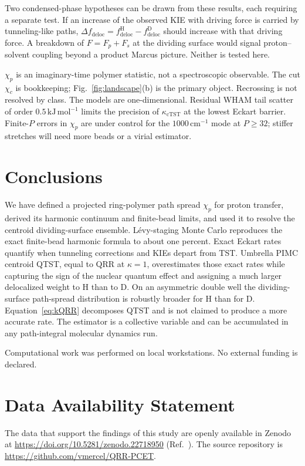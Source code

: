 \documentclass[%
 aip,
 jcp,
 amsmath,amssymb,
 reprint,
 floatfix,
]{revtex4-2}
\newcommand{\chip}{\chi_p}
\begin{document}
Two condensed-phase hypotheses can be drawn from these results, each requiring a separate test. If an increase of the observed KIE with driving force\cite{goldsmith2019,koper2011} is carried by tunneling-like paths, $\Delta f_{\mathrm{deloc}}=f_{\mathrm{deloc}}^{\mathrm{H}}-f_{\mathrm{deloc}}^{\mathrm{D}}$ should increase with that driving force. A breakdown of $F=F_p+F_s$ at the dividing surface would signal proton--solvent coupling beyond a product Marcus picture. Neither is tested here.

$\chip$ is an imaginary-time polymer statistic, not a spectroscopic observable. The cut $\chi_c$ is bookkeeping; Fig.~\ref{fig:landscape}(b) is the primary object. Recrossing is not resolved by class. The models are one-dimensional. Residual WHAM tail scatter of order $0.5\,\mathrm{kJ\,mol}^{-1}$ limits the precision of $\kappa_{\mathrm{cTST}}$ at the lowest Eckart barrier. Finite-$P$ errors in $\chip$ are under control for the $1000\,\mathrm{cm}^{-1}$ mode at $P\ge 32$; stiffer stretches will need more beads or a virial estimator.

\section{Conclusions}

We have defined a projected ring-polymer path spread $\chip$ for proton transfer, derived its harmonic continuum and finite-bead limits, and used it to resolve the centroid dividing-surface ensemble. L\'evy-staging Monte Carlo reproduces the exact finite-bead harmonic formula to about one percent. Exact Eckart rates quantify when tunneling corrections and KIEs depart from TST. Umbrella PIMC centroid QTST, equal to QRR at $\kappa=1$, overestimates those exact rates while capturing the sign of the nuclear quantum effect and assigning a much larger delocalized weight to H than to D. On an asymmetric double well the dividing-surface path-spread distribution is robustly broader for H than for D. Equation~\eqref{eq:kQRR} decomposes QTST and is not claimed to produce a more accurate rate. The estimator is a collective variable and can be accumulated in any path-integral molecular dynamics run.

\begin{acknowledgments}
Computational work was performed on local workstations. No external funding is declared.
\end{acknowledgments}

\section*{Data Availability Statement}
The data that support the findings of this study are openly available in Zenodo at \url{https://doi.org/10.5281/zenodo.22718950} (Ref.~).
The source repository is \url{https://github.com/vmercel/QRR-PCET}.



\end{document}
